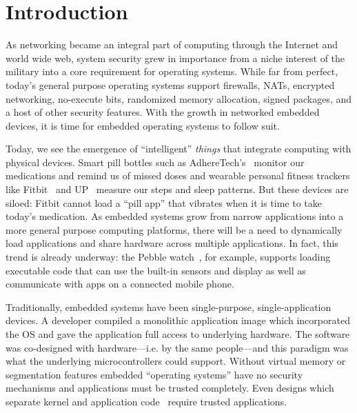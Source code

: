\section{Introduction}

As networking became an integral part of computing through the Internet and
world wide web, system security grew in importance from a niche interest of the
military into a core requirement for operating systems. While far from perfect,
today's general purpose operating systems support firewalls, NATs, encrypted
networking, no-execute bits, randomized memory allocation, signed packages, and a
host of other security features. With the growth in networked embedded
devices, it is time for embedded operating systems to follow suit.

Today, we see the emergence of ``intelligent'' \textit{things} that integrate
computing with physical devices.
Smart pill bottles such as AdhereTech's~\cite{adheretech} monitor our
medications and remind us of missed doses and wearable personal fitness trackers
like Fitbit~\cite{fitbit} and UP~\cite{jawboneup} measure our steps and sleep
patterns. But these devices are siloed: Fitbit cannot load a ``pill app'' that
vibrates when it is time to take today's medication.
As embedded systems grow from narrow applications into a more general
purpose computing platforms, there will be a need to dynamically load
applications and share hardware across multiple applications. In fact, this
trend is already underway: the Pebble watch~\cite{pebble}, for example, supports loading
executable code that can use the built-in sensors and display as well as
communicate with apps on a connected mobile phone.


Traditionally, embedded systems have been single-purpose, single-application
devices. A developer compiled a monolithic application image which incorporated
the OS and gave the application full access to underlying hardware.
The software was co-designed with hardware---i.e. by the same
people---and this paradigm was what the
underlying microcontrollers could support.
Without virtual memory or segmentation features
embedded ``operating systems'' have no
security mechanisms and applications must be trusted completely. Even designs
which separate kernel and application code~\cite{han05sos,contiki,freertos}
require trusted applications.

